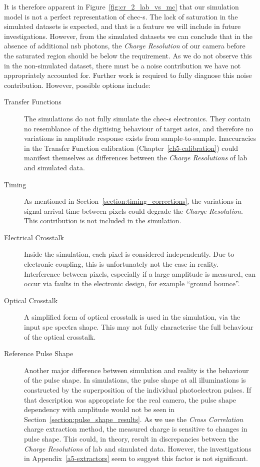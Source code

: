 It is therefore apparent in Figure~\ref{fig:cr_2_lab_vs_mc} that our simulation model is not a perfect representation of \gls{chec-s}. The lack of saturation in the simulated datasets is expected, and that is a feature we will include in future investigations. However, from the simulated datasets we can conclude that in the absence of additional \gls{nsb} photons, the \textit{Charge Resolution} of our camera before the saturated region should be below the requirement. As we do not observe this in the non-simulated dataset, there must be a noise contribution we have not appropriately accounted for. Further work is required to fully diagnose this noise contribution. However, possible options include:
\begin{description}
\item [Transfer Functions] The simulations do not fully simulate the \gls{chec-s} electronics. They contain no resemblance of the digitising behaviour of \gls{target} \glspl{asic}, and therefore no variations in amplitude response exists from sample-to-sample. Inaccuracies in the Transfer Function calibration (Chapter~\ref{ch5-calibration}) could manifest themselves as differences between the \textit{Charge Resolutions} of lab and simulated data.
\item [Timing] As mentioned in Section~\ref{section:timing_corrections}, the variations in signal arrival time between pixels could degrade the \textit{Charge Resolution}. This contribution is not included in the simulation.
\item [Electrical Crosstalk] Inside the simulation, each pixel is considered independently. Due to electronic coupling, this is unfortunately not the case in reality. Interference between pixels, especially if a large amplitude is measured, can occur via faults in the electronic design, for example ``ground bounce''.
\item [Optical Crosstalk] A simplified form of optical crosstalk is used in the simulation, via the input \gls{spe} spectra shape. This may not fully characterise the full behaviour of the optical crosstalk.
\item [Reference Pulse Shape] Another major difference between simulation and reality is the behaviour of the pulse shape. In simulations, the pulse shape at all illuminations is constructed by the superposition of the individual photoelectron pulses. If that description was appropriate for the real camera, the pulse shape dependency with amplitude would not be seen in Section~\ref{section:pulse_shape_results}. As we use the \textit{Cross Correlation} charge extraction method, the measured charge is sensitive to changes in pulse shape. This could, in theory, result in discrepancies between the \textit{Charge Resolutions} of lab and simulated data. However, the investigations in Appendix~\ref{a5-extractors} seem to suggest this factor is not significant.
\end{description}

